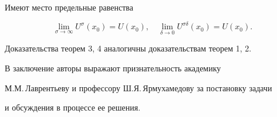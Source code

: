 \begin{thm} 


Имеют место предельные равенства 


$$ 


\lim_{\sigma\to \infty}U^\sigma(x_0)=U(x_0),\quad 


\lim_{\delta\to 0}U^{\sigma\delta}(x_0)=U(x_0). 


$$ 


\end{thm} 


 


Доказательства теорем 3, 4 аналогичны доказательствам теорем 1, 2. 


 


В заключение авторы выражают признательность академику 


М.М.\,Лаврентьеву и профессору Ш.Я.\,Ярмухамедову за постановку задачи 


и обсуждения в процессе ее решения. 


 


 


